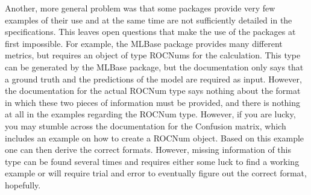 \color{red}
Another, more general problem was that some packages provide very few examples of their use and at the same time are not sufficiently detailed in the specifications. This leaves open questions that make the use of the packages at first impossible. For example, the MLBase package provides many different metrics, but requires an object of type ROCNums for the calculation. This type can be generated by the MLBase package, but the documentation only says that a ground truth and the predictions of the model are required as input. However, the documentation for the actual ROCNum type says nothing about the format in which these two pieces of information must be provided, and there is nothing at all in the examples regarding the ROCNum type. However, if you are lucky, you may stumble across the documentation for the Confusion matrix, which includes an example on how to create a ROCNum object. Based on this example one can then derive the correct formats. However, missing information of this type can be found several times and requires either some luck to find a working example or will require trial and error to eventually figure out the correct format, hopefully.
\color{black}

